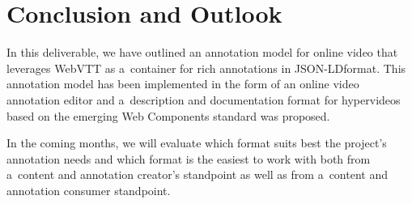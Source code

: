 \documentclass[runningheads,a4paper]{llncs}
\def\JSONLD{\mbox{JSON-LD}}
\def\JSONLD{\mbox{JSON-LD}}
\begin{document}
\section{Conclusion and Outlook}

In this deliverable, we have outlined an annotation model for online video
that leverages WebVTT as a~container for rich annotations in \JSONLD format.
This annotation model has been implemented
in the form of an online video annotation editor
and a~description and documentation format for hypervideos
based on the emerging Web Components standard was proposed.

In the coming months, we will evaluate which format suits best
the project's annotation needs and which format is the easiest to work with
both from a~content and annotation creator's standpoint as well as
from a~content and annotation consumer standpoint.



\end{document}
